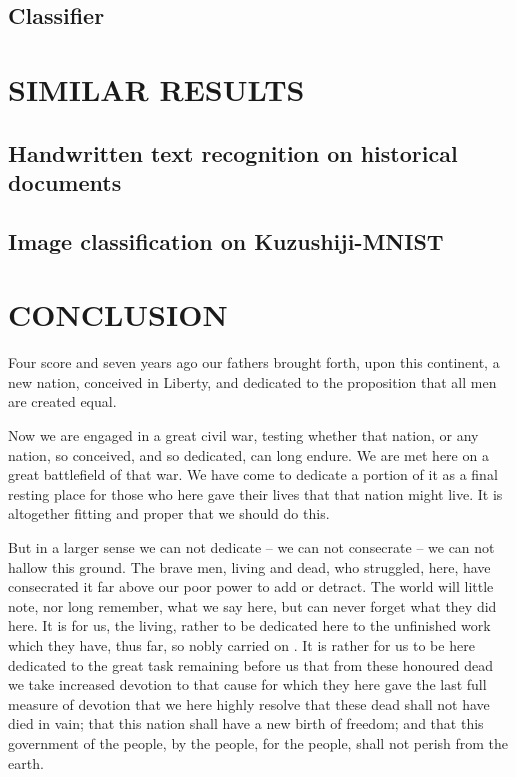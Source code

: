\documentclass{pasa}%
\begin{document}
\subsection{Classifier}
\label{ssec:classifierexp}

\section{\uppercase{Similar results}}
\label{sec:stateofart}

\subsection{Handwritten text recognition on historical documents}
\label{ssec:historicaldocuments}

\subsection{Image classification on Kuzushiji-MNIST}
\label{ssec:imagemnist}

\section{CONCLUSION}
\label{sec:conclusion}

Four score and seven years ago our fathers brought forth, upon this continent, a new nation, conceived in Liberty, and dedicated to the proposition that all men are created equal.

Now we are engaged in a great civil war, testing whether that nation, or any nation, so conceived, and so dedicated, can long endure. We are met here on a great battlefield of that war. We have come to dedicate a portion of it as a final resting place for those who here gave their lives that that nation might live. It is altogether fitting and proper that we should do this.

But in a larger sense we can not dedicate -- we can not consecrate -- we can not hallow this ground. The brave men, living and dead, who struggled, here, have consecrated it far above our poor power to add or detract. The world will little note, nor long remember, what we say here, but can never forget what they did here. It is for us, the living, rather to be dedicated here to the unfinished work which they have, thus far, so nobly carried on \cite{abt1961}. It is rather for us to be here dedicated to the great task remaining before us  that from these honoured dead we take increased devotion to that cause for which they here gave the last full measure of devotion  that we here highly resolve that these dead shall not have died in vain; that this nation shall have a new birth of freedom; and that this government \cite{abt1961} of the people, by the people, for the people, shall not perish from the earth.
\end{document}
